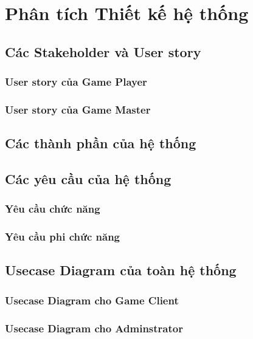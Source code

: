 \section{Phân tích Thiết kế hệ thống}

\subsection{Các Stakeholder và User story}
\subsubsection{User story của Game Player}
\subsubsection{User story của Game Master}

\subsection{Các thành phần của hệ thống}

\subsection{Các yêu cầu của hệ thống}
\subsubsection{Yêu cầu chức năng}
\subsubsection{Yêu cầu phi chức năng}

\subsection{Usecase Diagram của toàn hệ thống}
\subsubsection{Usecase Diagram cho Game Client}
\subsubsection{Usecase Diagram cho Adminstrator}